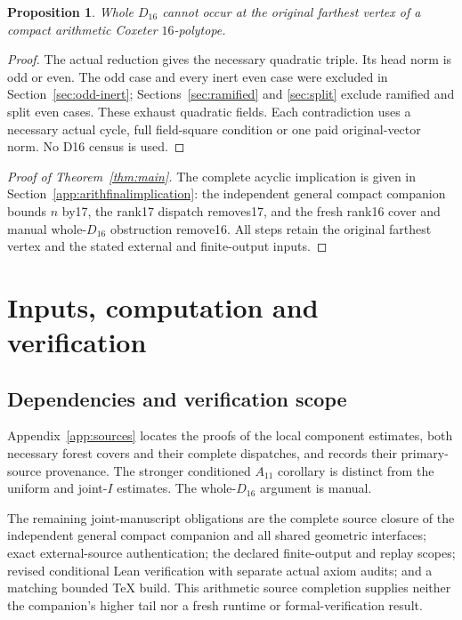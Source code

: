 \documentclass[11pt]{article}
\newtheorem{proposition}[theorem]{Proposition}
\begin{document}
\begin{proposition}\label{prop:noD16}
Whole $D_{16}$ cannot occur at the original farthest vertex
of a compact arithmetic Coxeter $16$-polytope.
\end{proposition}
\begin{proof}
The actual reduction gives the necessary quadratic triple.
Its head norm is odd or even. The odd case and every inert even
case were excluded in Section~\ref{sec:odd-inert};
Sections~\ref{sec:ramified} and \ref{sec:split} exclude
ramified and split even cases. These exhaust quadratic fields.
Each contradiction uses a necessary actual cycle, full field-square
condition or one paid original-vector norm. No D16 census is used.
\end{proof}

\begin{proof}[Proof of Theorem~\ref{thm:main}]
The complete acyclic implication is given in
Section~\ref{app:arithfinalimplication}: the independent general compact
companion bounds $n$ by17, the rank17 dispatch removes17, and the fresh
rank16 cover and manual whole-$D_{16}$ obstruction remove16.
All steps retain the original farthest vertex and the stated external
and finite-output inputs.
\end{proof}

\section{Inputs, computation and verification}\label{sec:verification}

\subsection{Dependencies and verification scope}
Appendix~\ref{app:sources} locates the proofs of the local component
estimates, both necessary forest covers and their complete dispatches,
and records their primary-source provenance. The stronger conditioned
$A_{11}$ corollary is distinct from the uniform and joint-$I$ estimates.
The whole-$D_{16}$ argument is manual.

The remaining joint-manuscript obligations are the complete source
closure of the independent general compact companion and all shared
geometric interfaces; exact external-source authentication; the declared
finite-output and replay scopes; revised conditional Lean verification
with separate actual axiom audits; and a matching bounded TeX build.
This arithmetic source completion supplies neither the companion's
higher tail nor a fresh runtime or formal-verification result.
\end{document}
